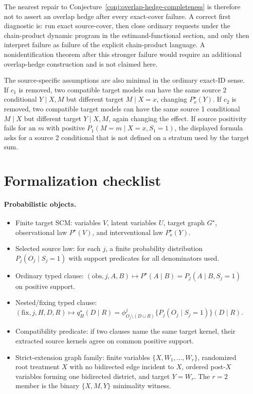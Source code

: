 \documentclass[11pt]{article}
\theoremstyle{definition}
\theoremstyle{plain}
\theoremstyle{remark}
\begin{document}
The nearest repair to Conjecture~\ref{conj:overlap-hedge-completeness} is
therefore not to assert an overlap hedge after every exact-cover failure.  A
correct first diagnostic is: run exact source-cover, then close ordinary
requests under the chain-product dynamic program in the estimand-functional
section, and only then
interpret failure as failure of the explicit chain-product language.  A
nonidentification theorem after this stronger failure would require an
additional overlap-hedge construction and is not claimed here.

The source-specific assumptions are also minimal in the ordinary exact-ID
sense.  If \(c_1\) is removed, two compatible target models can have the same
source 2 conditional \(Y\mid X,M\) but different target \(M\mid X=x\), changing
\(P^\star_x(Y)\).  If \(c_2\) is removed, two compatible target models can
have the same source 1 conditional \(M\mid X\) but different target
\(Y\mid X,M\), again changing the effect.  If source positivity fails for an
\(m\) with positive \(P_1(M=m\mid X=x,S_1=1)\), the displayed formula asks for
a source 2 conditional that is not defined on a stratum used by the target
sum.

\section{Formalization checklist}
\paragraph{Probabilistic objects.}
\begin{itemize}[leftmargin=*]
\item Finite target SCM: variables \(V\), latent variables \(U\), target graph
\(G^\star\), observational law \(P^\star(V)\), and interventional law
\(P^\star_x(Y)\).
\item Selected source law: for each \(j\), a finite probability distribution
\(P_j(O_j\mid S_j=1)\) with support predicates for all denominators used.
\item Ordinary typed clause:
\((\mathrm{obs},j,A,B)\mapsto P^\star(A\mid B)=P_j(A\mid B,S_j=1)\) on
positive support.
\item Nested/fixing typed clause:
\((\mathrm{fix},j,H,D,R)\mapsto q^\star_H(D\mid R)=
\phi^j_{O_j\setminus(D\cup R)}\{P_j(O_j\mid S_j=1)\}(D\mid R)\).
\item Compatibility predicate: if two clauses name the same target kernel,
their extracted source kernels agree on common positive support.
\item Strict-extension graph family: finite variables
\(\{X,W_1,\ldots,W_r\}\), randomized root treatment \(X\) with no bidirected
edge incident to \(X\), ordered post-\(X\) variables forming one bidirected
district, and target \(Y=W_r\).  The \(r=2\) member is the binary
\(\{X,M,Y\}\) minimality witness.
\end{itemize}
\end{document}
